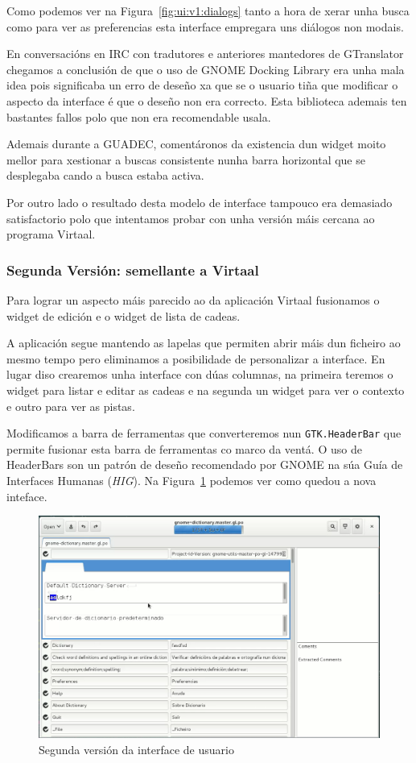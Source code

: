 Como podemos ver na Figura~\ref{fig:ui:v1:dialogs} tanto a hora de xerar unha busca como para ver as preferencias esta interface empregara uns diálogos non modais.

En conversacións en IRC con tradutores e anteriores mantedores de GTranslator chegamos a conclusión de que o uso de GNOME Docking Library era unha mala idea pois significaba un erro de deseño xa que se o usuario tiña que modificar o aspecto da interface é que o deseño non era correcto. Esta biblioteca ademais ten bastantes fallos polo que non era recomendable usala.

Ademais durante a GUADEC, comentáronos da existencia dun widget moito mellor para xestionar a buscas consistente nunha barra horizontal que se desplegaba cando a busca estaba activa.

Por outro lado o resultado desta modelo de interface tampouco era demasiado satisfactorio polo que intentamos probar con unha versión máis cercana ao programa Virtaal.

\subsubsection{Segunda Versión: semellante a Virtaal}

Para lograr un aspecto máis parecido ao da aplicación Virtaal fusionamos o widget de edición e o widget de lista de cadeas.

A aplicación segue mantendo as lapelas que permiten abrir máis dun ficheiro ao mesmo tempo pero eliminamos a posibilidade de personalizar a interface. En lugar diso crearemos unha interface con dúas columnas, na primeira teremos o widget para listar e editar as cadeas e na segunda un widget para ver o contexto e outro para ver as pistas.

Modificamos a barra de ferramentas que converteremos nun \lstinline{GTK.HeaderBar} que permite fusionar esta barra de ferramentas co marco da ventá. O uso de HeaderBars son un patrón de deseño recomendado por GNOME na súa Guía de Interfaces Humanas (\emph{HIG}). Na Figura~\ref{fig:ui:v2:general} podemos ver como quedou a nova inteface.

\begin{figure}[h!]
  \centering
    \includegraphics[width=\textwidth]{img/curso2014_it1_ui.png}
    \caption{Segunda versión da interface de usuario}
    \label{fig:ui:v2:general}
\end{figure}

